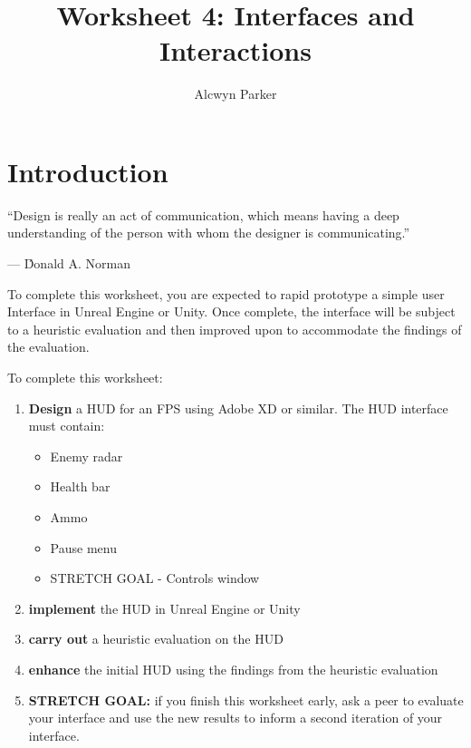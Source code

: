 \documentclass{../../../fal_assignment}
\title{Worksheet 4: Interfaces and Interactions}
\author{Alcwyn Parker	}
\begin{document}
\maketitle

\section*{Introduction}

\begin{marginquote}
``Design is really an act of communication, which means having a deep understanding of the person with whom the designer is communicating.''
\par --- \'Donald A. Norman
\end{marginquote}

To complete this worksheet, you are expected to rapid prototype a simple user Interface in Unreal Engine or Unity. Once complete, the interface will be subject to a heuristic evaluation and then improved upon to accommodate the findings of the evaluation. 

To complete this worksheet: 

\begin{enumerate}[label=(\roman*)]
    \item \textbf{Design} a HUD for an FPS using Adobe XD or similar. The HUD interface must contain:
    \begin{itemize}
    	\item Enemy radar 
	\item Health bar
	\item Ammo
	\item Pause menu
	\item STRETCH GOAL - Controls window
    \end{itemize}
    \item \textbf{implement} the HUD in Unreal Engine or Unity
    \item \textbf{carry out} a heuristic evaluation on the HUD 
    \item \textbf{enhance} the initial HUD using the findings from the heuristic evaluation
    \item \textbf{STRETCH GOAL: } if you finish this worksheet early, ask a peer to evaluate your interface and use the new results to inform a second iteration of your interface. 
\end{enumerate}
\end{document}
